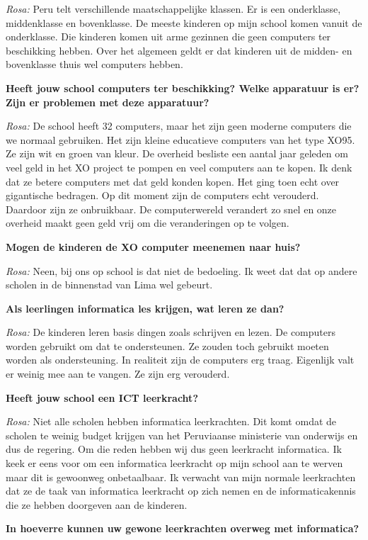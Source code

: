 \textit{Rosa:} Peru telt verschillende maatschappelijke klassen. Er is een onderklasse, middenklasse en bovenklasse. De meeste kinderen op mijn school komen vanuit de onderklasse. Die kinderen komen uit arme gezinnen die geen computers ter beschikking hebben. Over het algemeen geldt er dat kinderen uit de midden- en bovenklasse thuis wel computers hebben.

\textbf{Heeft jouw school computers ter beschikking? Welke apparatuur is er? Zijn er problemen met deze apparatuur?}

\textit{Rosa:} De school heeft 32 computers, maar het zijn geen moderne computers die we normaal gebruiken. Het zijn kleine educatieve computers van het type XO95. Ze zijn wit en groen van kleur. De overheid besliste een aantal jaar geleden om veel geld in het XO project te pompen en veel computers aan te kopen. Ik denk dat ze betere computers met dat geld konden kopen. Het ging toen echt over gigantische bedragen. Op dit moment zijn de computers echt verouderd. Daardoor zijn ze onbruikbaar. De computerwereld verandert zo snel en onze overheid maakt geen geld vrij om die veranderingen op te volgen.

\textbf{Mogen de kinderen de XO computer meenemen naar huis?}

\textit{Rosa:} Neen, bij ons op school is dat niet de bedoeling. Ik weet dat dat op andere scholen in de binnenstad van Lima wel gebeurt.

\textbf{Als leerlingen informatica les krijgen, wat leren ze dan?}

\textit{Rosa:} De kinderen leren basis dingen zoals schrijven en lezen. De computers worden gebruikt om dat te ondersteunen. Ze zouden toch gebruikt moeten worden als ondersteuning. In realiteit zijn de computers erg traag. Eigenlijk valt er weinig mee aan te vangen. Ze zijn erg verouderd.

\textbf{Heeft jouw school een ICT leerkracht?}

\textit{Rosa:} Niet alle scholen hebben informatica leerkrachten. Dit komt omdat de scholen te weinig budget krijgen van het Peruviaanse ministerie van onderwijs en dus de regering. Om die reden hebben wij dus geen leerkracht informatica. Ik keek er eens voor om een informatica leerkracht op mijn school aan te werven maar dit is gewoonweg onbetaalbaar. Ik verwacht van mijn normale leerkrachten dat ze de taak van informatica leerkracht op zich nemen en de informaticakennis die ze hebben doorgeven aan de kinderen.

\textbf{In hoeverre kunnen uw gewone leerkrachten overweg met informatica?}

